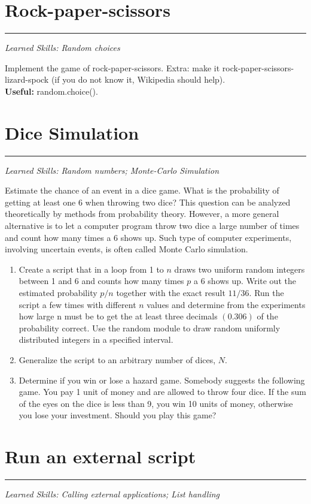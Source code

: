 \documentclass[smallheadings,12pt]{scrartcl}
\newcommand{\skills}[1]{\rule{1cm}{0pt}{\begin{minipage}{.8\textwidth}\small\em
      Learned Skills:  #1\end{minipage}}}
\begin{document}
\section{Rock-paper-scissors}
\skills{Random choices}

Implement the game of rock-paper-scissors.
Extra: make it {rock-paper-scissors-lizard-spock} (if you do not know it, Wikipedia should help).\\[2pt]
\textbf{Useful:} random.choice().

\section{Dice Simulation}
\skills{Random numbers; Monte-Carlo Simulation}

Estimate the chance of an event in a dice game.  What is the
probability of getting at least one 6 when throwing two dice?  This
question can be analyzed theoretically by methods from probability
theory. However, a more general alternative is to let a computer
program throw two dice a large number of times and count how many
times a 6 shows up. Such type of computer experiments, involving
uncertain events, is often called Monte Carlo simulation. 

\begin{enumerate}
\item Create a script that in a loop from 1 to $n$ draws two uniform
  random integers between 1 and 6 and counts how many times $p$ a 6
  shows up. Write out the estimated probability $p/n$ together with
  the exact result $11/36$.  Run the script a few times with different
  $n$ values and determine from the experiments how large n must be to
  get the at least three decimals $(0.306)$ of the probability
  correct.  Use the random module to draw random uniformly distributed
  integers in a specified interval.
\item Generalize the script to an arbitrary number of dices, $N$.
\item Determine if you win or lose a hazard game.  Somebody suggests
  the following game. You pay 1 unit of money and are allowed to throw
  four dice. If the sum of the eyes on the dice is less than 9, you
  win 10 units of money, otherwise you lose your investment. Should
  you play this game?
\end{enumerate}

\section{Run an external script}
\skills{Calling external applications; List handling}
\end{document}

